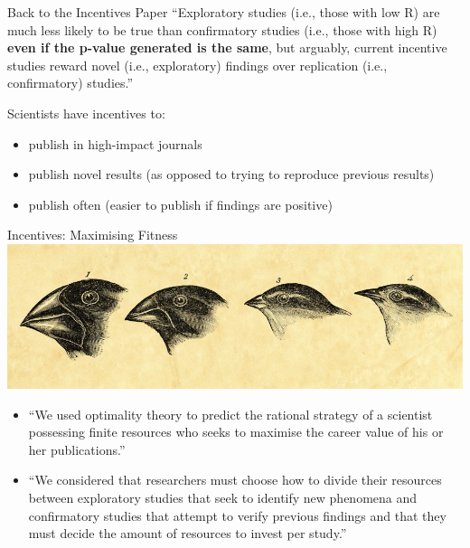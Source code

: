 \documentclass{beamer}
\begin{document}
\begin{frame}{Back to the Incentives Paper}
	``Exploratory studies (i.e., those with low R) are much less likely to be true than confirmatory studies
		(i.e., those with high R) \textbf{even if the p-value generated is the same}, but arguably, current incentive
		studies reward novel (i.e., exploratory) findings over replication (i.e., confirmatory) studies.''

	\vspace{10pt}
	
	Scientists have incentives to:
	\begin{itemize}
		\item<3-> publish in high-impact journals
		\item<4-> publish novel results (as opposed to trying to reproduce previous results)
		\item<5-> publish often (easier to publish if findings are positive)

	\end{itemize}
	
\end{frame}

\begin{frame}{Incentives: Maximising Fitness}
	\includegraphics[width=1\textwidth]{../images/natural-selection.jpg}

	\begin{itemize}
		\item<1-> ``We used optimality theory to predict the rational strategy of a scientist possessing finite
		resources who seeks to maximise the career value of his or her publications.''
		\item<2-> ``We considered that researchers must choose how to divide their resources between exploratory studies that seek to
		identify new phenomena and confirmatory studies that attempt to verify previous findings
		and that they must decide the amount of resources to invest per study.''
	\end{itemize}
	
\end{frame}
\end{document}
